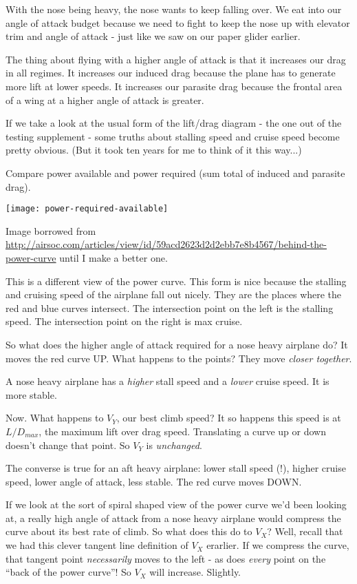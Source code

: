 With the nose being heavy, the nose wants to keep falling over. We eat into our angle of attack budget because we need to fight to keep the nose up with elevator trim and angle of attack - just like we saw on our paper glider earlier.

The thing about flying with a higher angle of attack is that it increases our drag in all regimes. It increases our induced drag because the plane has to generate more lift at lower speeds. It increases our parasite drag because the frontal area of a wing at a higher angle of attack is greater.

If we take a look at the usual form of the lift/drag diagram - the one out of the testing supplement - some truths about stalling speed and cruise speed become pretty obvious. (But it took ten years for me to think of it this way...)

Compare power available and power required (sum total of induced and parasite drag).

\texttt{[image: power-required-available]}

Image borrowed from \url{http://airsoc.com/articles/view/id/59acd2623d2d2ebb7e8b4567/behind-the-power-curve} until I make a better one.

This is a different view of the power curve. This form is nice because the stalling and cruising speed of the airplane fall out nicely. They are the places where the red and blue curves intersect. The intersection point on the left is the stalling speed. The intersection point on the right is max cruise.

So what does the higher angle of attack required for a nose heavy airplane do? It moves the red curve UP. What happens to the points? They move \emph{closer together}.

A nose heavy airplane has a \emph{higher} stall speed and a \emph{lower} cruise speed. It is more stable.

Now. What happens to $V_Y$, our best climb speed? It so happens this speed is at $L/D_{max}$, the maximum lift over drag speed. Translating a curve up or down doesn't change that point. So $V_Y$ is \emph{unchanged}.

The converse is true for an aft heavy airplane: lower stall speed (!), higher cruise speed, lower angle of attack, less stable. The red curve moves DOWN.

If we look at the sort of spiral shaped view of the power curve we'd been looking at, a really high angle of attack from a nose heavy airplane would compress the curve about its best rate of climb. So what does this do to $V_X$? Well, recall that we had this clever tangent line definition of $V_X$ erarlier. If we compress the curve, that tangent point \emph{necessarily} moves to the left - as does \emph{every} point on the ``back of the power curve''! So $V_X$ will increase. Slightly.

